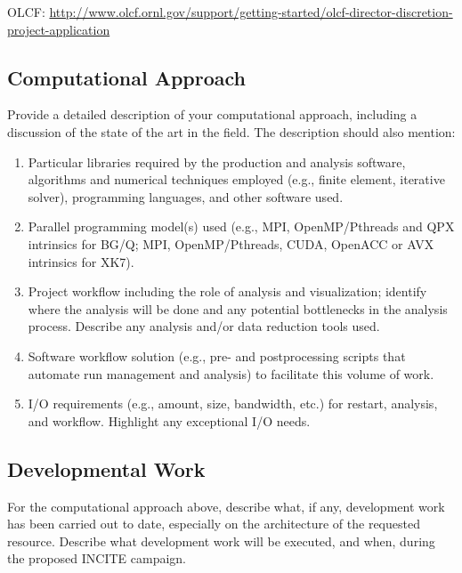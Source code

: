 \documentclass[11pt,letterpaper,english]{article}
\begin{document}
OLCF: {\href{http://www.olcf.ornl.gov/support/getting-started/olcf-director-discretion-project-application}{http://www.olcf.ornl.gov/support/getting-started/olcf-director-discretion-project-application}}

\vspace{-.25in}
\subsection{Computational Approach}
\vspace{-.2in}

Provide a detailed description of your computational approach, including a discussion of the state of the art in the field. The description should also mention:

\vspace{-.25in}
\begin{enumerate}
\item Particular libraries required by the production and analysis software, algorithms and numerical techniques employed (e.g., finite element, iterative solver), programming languages, and other software used.
\item Parallel programming model(s) used (e.g., MPI, OpenMP/Pthreads and QPX intrinsics for BG/Q; MPI, OpenMP/Pthreads, CUDA, OpenACC or AVX intrinsics for XK7).
\item Project workflow including the role of analysis and visualization; identify where the analysis will be done and any potential bottlenecks in the analysis process.  Describe any analysis and/or data reduction tools used.
\item Software workflow solution (e.g., pre- and postprocessing scripts that automate run management and analysis) to facilitate this volume of work.
\item I/O requirements (e.g., amount, size, bandwidth, etc.) for restart, analysis, and workflow. Highlight any exceptional I/O needs.
\end{enumerate}

\vspace{-.25in}
\subsection{Developmental Work}
\vspace{-.2in}

For the computational approach above, describe what, if any, development work has been carried out to date, especially on the architecture of the requested resource. Describe what development work will be executed, and when,  during the proposed INCITE campaign.
\end{document}
